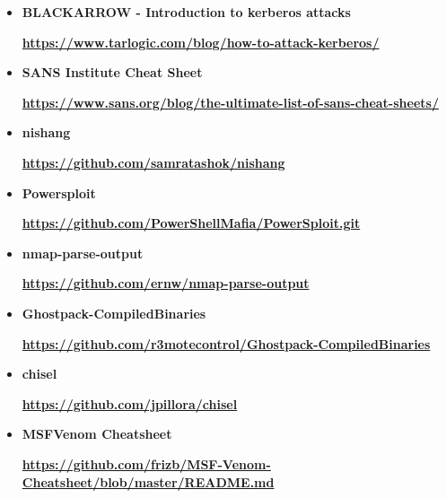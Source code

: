 \begin{itemize}
  
\item \textbf{BLACKARROW - Introduction to kerberos attacks}

    \par 
      \href{https://www.tarlogic.com/blog/how-to-attack-kerberos/}{\textbf{\color{blue}https://www.tarlogic.com/blog/how-to-attack-kerberos/}}
    
  
\item \textbf{SANS Institute Cheat Sheet}

    \par 
      \href{https://www.sans.org/blog/the-ultimate-list-of-sans-cheat-sheets/}{\textbf{\color{blue}https://www.sans.org/blog/the-ultimate-list-of-sans-cheat-sheets/}}
    
  
\item \textbf{nishang}

    \par 
      \href{https://github.com/samratashok/nishang}{\textbf{\color{blue}https://github.com/samratashok/nishang}}
    
  
\item \textbf{Powersploit}

    \par 
      \href{https://github.com/PowerShellMafia/PowerSploit.git}{\textbf{\color{blue}https://github.com/PowerShellMafia/PowerSploit.git}}
    
  
\item \textbf{nmap-parse-output}

    \par 
      \href{https://github.com/ernw/nmap-parse-output}{\textbf{\color{blue}https://github.com/ernw/nmap-parse-output}}
    
  
\item \textbf{Ghostpack-CompiledBinaries}

    \par 
      \href{https://github.com/r3motecontrol/Ghostpack-CompiledBinaries}{\textbf{\color{blue}https://github.com/r3motecontrol/Ghostpack-CompiledBinaries}}
    
  
\item \textbf{chisel}

    \par 
      \href{https://github.com/jpillora/chisel}{\textbf{\color{blue}https://github.com/jpillora/chisel}}
    
  
\item \textbf{MSFVenom Cheatsheet}

    \par 
      \href{https://github.com/frizb/MSF-Venom-Cheatsheet/blob/master/README.md}{\textbf{\color{blue}https://github.com/frizb/MSF-Venom-Cheatsheet/blob/master/README.md}}
    

\end{itemize}
